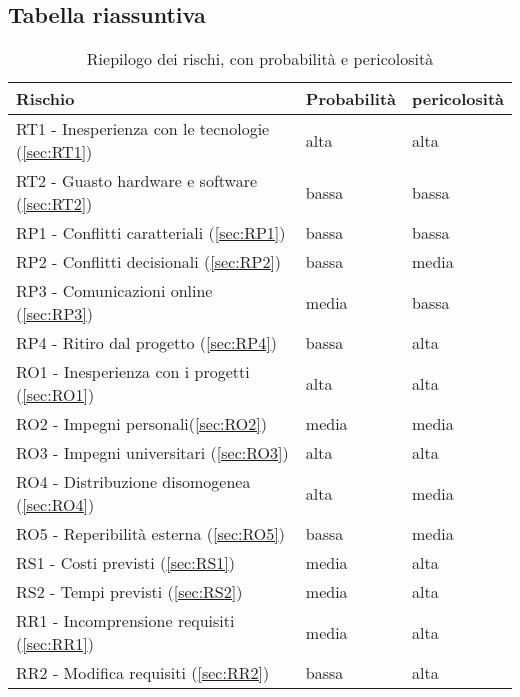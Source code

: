 \subsection{Tabella riassuntiva}

    \begin{table}[H]
        \begin{tabular}{p{8cm}>{\raggedright\arraybackslash}p{3cm}>{\raggedright\arraybackslash}p{3cm}}

            \toprule
            \rowcolor{gray!20} \textbf{Rischio}	& \textbf{Probabilità} & \textbf{pericolosità} 
            \\\midrule
            RT1 - Inesperienza con le tecnologie (\ref{sec:RT1})
            & alta
            & alta
            \\\midrule
            RT2 - Guasto hardware e software (\ref{sec:RT2})
            & bassa
            & bassa
            \\\midrule
            RP1 - Conflitti caratteriali (\ref{sec:RP1})
            & bassa
            & bassa
            \\\midrule
            RP2 - Conflitti decisionali (\ref{sec:RP2})
            & bassa
            & media
            \\\midrule
            RP3 - Comunicazioni online (\ref{sec:RP3})
            & media
            & bassa
            \\\midrule
            RP4 - Ritiro dal progetto (\ref{sec:RP4})
            & bassa
            & alta
            \\\midrule
            RO1 - Inesperienza con i progetti (\ref{sec:RO1})
            & alta
            & alta
            \\\midrule
            RO2 - Impegni personali(\ref{sec:RO2})
            & media
            & media
            \\\midrule
            RO3 - Impegni universitari (\ref{sec:RO3})
            & alta
            & alta
            \\\midrule
            RO4 - Distribuzione disomogenea (\ref{sec:RO4})
            & alta 
            & media
            \\\midrule
            RO5 - Reperibilità esterna (\ref{sec:RO5})
            & bassa 
            & media
            \\\midrule
            RS1 - Costi previsti (\ref{sec:RS1})
            & media
            & alta
            \\\midrule
            RS2 - Tempi previsti (\ref{sec:RS2})
            & media
            & alta
            \\\midrule
            RR1 - Incomprensione requisiti (\ref{sec:RR1})
            & media
            & alta
            \\\midrule
            RR2 - Modifica requisiti (\ref{sec:RR2})
            & bassa
            & alta
            \\\bottomrule
        \end{tabular}
        \caption{Riepilogo dei rischi, con probabilità e pericolosità}
        \label{tab:rischi}
    \end{table}
